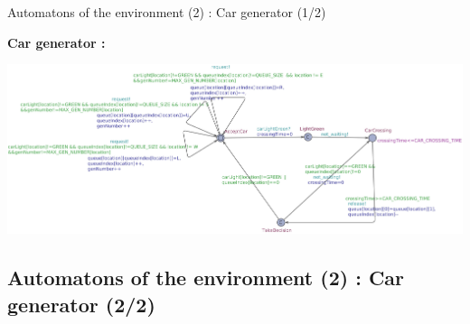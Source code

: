 \documentclass{bredelebeamer}
\begin{document}
\begin{frame}{Automatons of the environment (2) : Car generator (1/2)}


\textbf{Car generator : }



\includegraphics[scale=0.20]{images/imageCarGenerator.jpg}



\end{frame}


\subsection{Automatons of the environment (2) : Car generator (2/2)}
\end{document}
